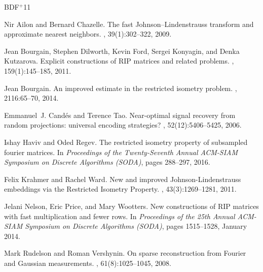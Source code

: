 \documentclass[11pt]{article}
\begin{document}

\newcommand{\etalchar}[1]{$^{#1}$}
\begin{thebibliography}{BDF{\etalchar{+}}11}

Nir Ailon and Bernard Chazelle.
\newblock The fast {Johnson}--{Lindenstrauss} transform and approximate nearest
  neighbors.
, 39(1):302--322, 2009.

\bibitem[BDF{\etalchar{+}}11]{BourgainDFKK11}
Jean Bourgain, Stephen Dilworth, Kevin Ford, Sergei Konyagin, and Denka
  Kutzarova.
\newblock Explicit constructions of {RIP} matrices and related problems.
, 159(1):145--185, 2011.

Jean Bourgain.
\newblock An improved estimate in the restricted isometry problem.
, 2116:65--70, 2014.

Emmanuel~J. Cand\'{e}s and Terence Tao.
\newblock Near-optimal signal recovery from random projections: universal
  encoding strategies?
, 52(12):5406--5425, 2006.

Ishay Haviv and Oded Regev.
\newblock The restricted isometry property of subsampled fourier matrices.
\newblock In {\em Proceedings of the Twenty-Seventh Annual {ACM-SIAM} Symposium
  on Discrete Algorithms (SODA)}, pages 288--297, 2016.

Felix Krahmer and Rachel Ward.
\newblock New and improved {Johnson}-{Lindenstrauss} embeddings via the
  {Restricted} {Isometry} {Property}.
, 43(3):1269--1281, 2011.

Jelani Nelson, Eric Price, and Mary Wootters.
\newblock New constructions of {RIP} matrices with fast multiplication and
  fewer rows.
\newblock In {\em Proceedings of the 25th Annual ACM-SIAM Symposium on Discrete
  Algorithms (SODA)}, pages 1515--1528, January 2014.

Mark Rudelson and Roman Vershynin.
\newblock On sparse reconstruction from {Fourier} and {Gaussian} measurements.
, 61(8):1025--1045, 2008.

\end{thebibliography}
\end{document}
